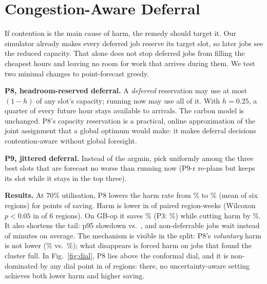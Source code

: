 \section{Congestion-Aware Deferral}\label{sec:congestion}

If contention is the main cause of harm, the remedy should target it. Our simulator already makes
every deferred job reserve its target slot, so later jobs see the reduced capacity. That alone does not
stop deferred jobs from filling the cheapest hours and leaving no room for work that arrives during them.
We test two minimal changes to point-forecast greedy.

\textbf{P8, headroom-reserved deferral.} A \emph{deferred} reservation may use at most $(1-h)$ of any
slot's capacity; running now may use all of it. With $h{=}0.25$, a quarter of every future hour stays
available to arrivals. The carbon model is unchanged. P8's capacity reservation is a practical,
online approximation of the joint assignment that a global optimum would make: it makes deferral
decisions contention-aware without global foresight.

\textbf{P9, jittered deferral.} Instead of the argmin, pick uniformly among the three best slots that
are forecast no worse than running now (P9-r re-plans but keeps its slot while it stays in the top three).

\textbf{Results.} At 70\% utilisation, P8 lowers the harm rate from
\% to \%
(mean of six regions) for  points of saving. Harm is lower
in  of  paired region-weeks
(Wilcoxon $p{<}0.05$ in  of 6 regions). On GB-op it saves
\% (P3: \%)
while cutting harm by \%. It also shortens the tail: p95
slowdown  vs.\ ,
and non-deferrable jobs wait  instead of
 minutes on average. The mechanism is visible
in the split: P8's \emph{voluntary} harm is not lower
(\% vs.\ \%);
what disappears is forced harm on jobs that found the cluster full.
In Fig.~\ref{fig:dial}, P8 lies above the conformal dial, and it is non-dominated by any dial point in
 of  regions: there, no uncertainty-aware
setting achieves both lower harm and higher saving.

